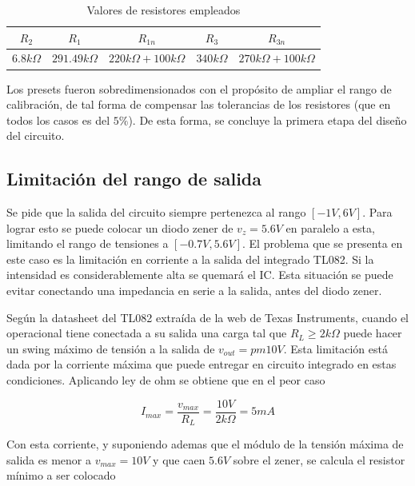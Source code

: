   \begin{table}[H]
	\begin{center}
		\begin{tabular}{c c c c c}
		$R_2$ & $R_1$ & $R_{1n}$ & $R_3$ & $R_{3n}$ \\
		\hline
		$6.8 k\Omega$ & $291.49 k\Omega$ & $220 k\Omega + 100 k\Omega$ & $340 k\Omega$ & $270 k\Omega + 100 k\Omega$
		\end{tabular}
		
		\caption{Valores de resistores empleados}
	\end{center}
\end{table}

Los presets fueron sobredimensionados con el prop\'osito de ampliar el rango de calibraci\'on, de tal forma de compensar las tolerancias de los resistores (que en todos los casos es del $5\%$).
 De esta forma, se concluye la primera etapa del diseño del circuito.

 \subsection{Limitaci\'on del rango de salida}

 Se pide que la salida del circuito siempre pertenezca al rango $[-1V , 6V]$. Para lograr esto se puede colocar un diodo zener de $v_z = 5.6 V$ en paralelo a esta, limitando el rango de tensiones a $[-0.7V , 5.6V]$.
  El problema que se presenta en este caso es la limitación en corriente a la salida del integrado TL082. Si la intensidad es considerablemente alta se quemar\'a el IC. 
  Esta situaci\'on se puede evitar conectando una impedancia en serie a la salida, antes del diodo zener.


Seg\'un la datasheet del TL082 extra\'ida de la web de Texas Instruments, cuando el operacional tiene conectada a su salida una carga tal que $R_L \geq 2k\Omega$ puede hacer un swing m\'aximo de tensi\'on a la salida de $v_{out} = pm10V$.
 Esta limitaci\'on est\'a dada por la corriente m\'axima que puede entregar en circuito integrado en estas condiciones. Aplicando ley de ohm se obtiene que en el peor caso

 \begin{equation}
    I_{max} = \frac{v_{max}}{R_L} = \frac{10V}{2k\Omega} = 5mA
    \label{fig:EJ6_ecuacion_corriente}
\end{equation}

Con esta corriente, y suponiendo ademas que el m\'odulo de la tensi\'on m\'axima de salida es menor a  $v_{max} = 10V$ y que caen $5.6V$ sobre el zener, se calcula el resistor m\'inimo a ser colocado

